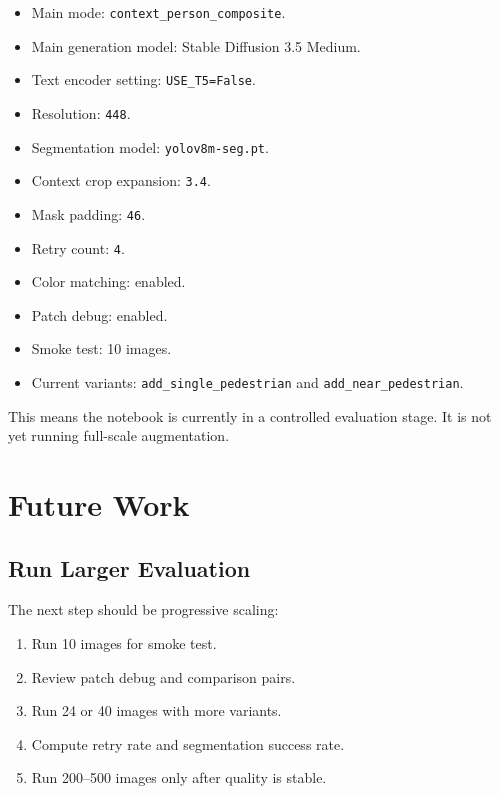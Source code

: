 \documentclass[12pt,a4paper]{article}
\begin{document}
\begin{itemize}
    \item Main mode: \texttt{context\_person\_composite}.
    \item Main generation model: Stable Diffusion 3.5 Medium.
    \item Text encoder setting: \texttt{USE\_T5=False}.
    \item Resolution: \texttt{448}.
    \item Segmentation model: \texttt{yolov8m-seg.pt}.
    \item Context crop expansion: \texttt{3.4}.
    \item Mask padding: \texttt{46}.
    \item Retry count: \texttt{4}.
    \item Color matching: enabled.
    \item Patch debug: enabled.
    \item Smoke test: 10 images.
    \item Current variants: \texttt{add\_single\_pedestrian} and
          \texttt{add\_near\_pedestrian}.
\end{itemize}

This means the notebook is currently in a controlled evaluation stage. It is not
yet running full-scale augmentation.

\section{Future Work}

\subsection{Run Larger Evaluation}

The next step should be progressive scaling:

\begin{enumerate}
    \item Run 10 images for smoke test.
    \item Review patch debug and comparison pairs.
    \item Run 24 or 40 images with more variants.
    \item Compute retry rate and segmentation success rate.
    \item Run 200--500 images only after quality is stable.
\end{enumerate}
\end{document}

